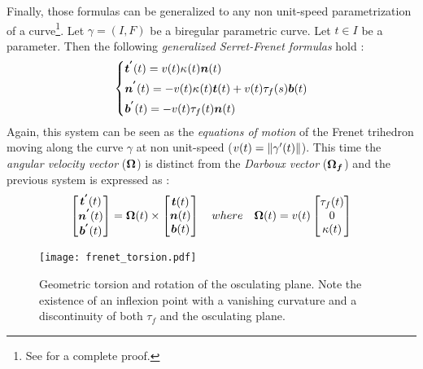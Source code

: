 Finally, those formulas can be generalized to any non unit-speed parametrization of a curve\footnote{See \cite[p.203]{Gray2006} for a complete proof.}. Let $\gamma = (I,F)$ be a biregular parametric curve. Let $t \in I$ be a parameter. Then the following \emph{generalized Serret-Frenet formulas} hold :
\begin{equation}
	\left\{
	\begin{aligned}
		&\boldsymbol{t^{'}}(t) 	=  v(t) \kappa_{}(t) \boldsymbol{n}(t)\\
		&\boldsymbol{n^{'}}(t) 	=  -v(t) \kappa_{}(t) \boldsymbol{t}(t) + v(t) \tau_f(s) \boldsymbol{b}(t) \\
		&\boldsymbol{b^{'}}(t) 	=  -v(t) \tau_f(t) \boldsymbol{n}(t) \\
	\end{aligned}
	\right.
\end{equation}
Again, this system can be seen as the \emph{equations of motion} of the Frenet trihedron moving along the curve $\gamma$ at non unit-speed ($v(t) = \lVert\gamma'(t)\rVert$). This time the \emph{angular velocity vector} ($\boldsymbol{\Omega}$) is distinct from the \emph{Darboux vector} ($\boldsymbol{\Omega_f}$) and the previous system is expressed as :
\begin{equation}
	\begin{bmatrix}		
		\boldsymbol{t^{'}}(t) \\
		\boldsymbol{n^{'}}(t) \\
		\boldsymbol{b^{'}}(t) \\
	\end{bmatrix}
	=
	\boldsymbol{\Omega}(t)
	\times
	\begin{bmatrix}		
		\boldsymbol{t}(t) \\
		\boldsymbol{n}(t) \\
		\boldsymbol{b}(t) \\
	\end{bmatrix}
	\quad where \quad
	\boldsymbol{\Omega}(t)
	=
	v(t)
	\begin{bmatrix}
		\tau_f(t) \\
		0 \\
		\kappa(t)
	\end{bmatrix}
\end{equation}


\begin{figure}[t]
	\centering
	\texttt{[image: frenet\_torsion.pdf]}
	\caption{Geometric torsion and rotation of the osculating plane. Note the existence of an inflexion point with a vanishing curvature and a discontinuity of both $\tau_f$ and the osculating plane.}
	\label{fig:3_3}
\end{figure}

